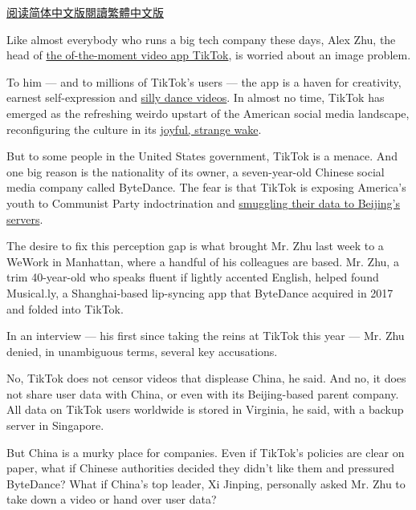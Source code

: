 \href{https://cn.nytimes3xbfgragh.onion/technology/20191118/tiktok-alex-zhu-interview/}{阅读简体中文版}\href{https://cn.nytimes3xbfgragh.onion/technology/20191118/tiktok-alex-zhu-interview/zh-hant/}{閱讀繁體中文版}

Like almost everybody who runs a big tech company these days, Alex Zhu,
the head of
\href{https://www.nytimes3xbfgragh.onion/2019/03/10/style/what-is-tik-tok.html}{the
of-the-moment video app TikTok}, is worried about an image problem.

To him --- and to millions of TikTok's users --- the app is a haven for
creativity, earnest self-expression and
\href{https://www.nytimes3xbfgragh.onion/2019/10/19/style/high-school-tiktok-clubs.html}{silly
dance videos}. In almost no time, TikTok has emerged as the refreshing
weirdo upstart of the American social media landscape, reconfiguring the
culture in its
\href{https://www.nytimes3xbfgragh.onion/interactive/2019/10/10/arts/TIK-TOK.html}{joyful,
strange wake}.

But to some people in the United States government, TikTok is a menace.
And one big reason is the nationality of its owner, a seven-year-old
Chinese social media company called ByteDance. The fear is that TikTok
is exposing America's youth to Communist Party indoctrination and
\href{https://www.blackburn.senate.gov/blackburn-tiktok-you-are-chinas-best-detective}{smuggling
their data to Beijing's servers}.

The desire to fix this perception gap is what brought Mr. Zhu last week
to a WeWork in Manhattan, where a handful of his colleagues are based.
Mr. Zhu, a trim 40-year-old who speaks fluent if lightly accented
English, helped found Musical.ly, a Shanghai-based lip-syncing app that
ByteDance acquired in 2017 and folded into TikTok.

In an interview --- his first since taking the reins at TikTok this year
--- Mr. Zhu denied, in unambiguous terms, several key accusations.

No, TikTok does not censor videos that displease China, he said. And no,
it does not share user data with China, or even with its Beijing-based
parent company. All data on TikTok users worldwide is stored in
Virginia, he said, with a backup server in Singapore.

But China is a murky place for companies. Even if TikTok's policies are
clear on paper, what if Chinese authorities decided they didn't like
them and pressured ByteDance? What if China's top leader, Xi Jinping,
personally asked Mr. Zhu to take down a video or hand over user data?

